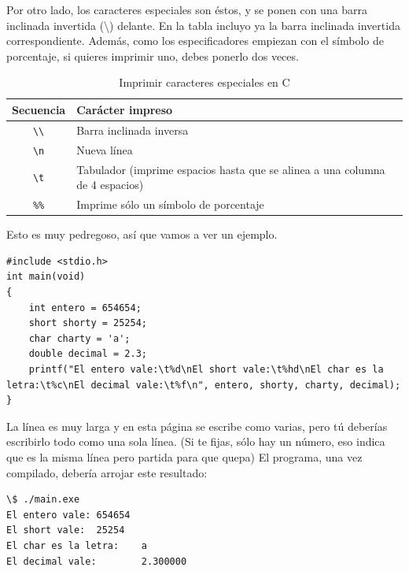 \documentclass[a4paper]{article}
\begin{document}
Por otro lado, los caracteres especiales son éstos, y se ponen con una barra
inclinada invertida (\textbackslash{}) delante. En la tabla incluyo ya la barra
inclinada invertida correspondiente. Además, como los especificadores empiezan
con el símbolo de porcentaje, si quieres imprimir uno, debes ponerlo dos veces.

\begin{table}[H]
\centering
\begin{tabularx}{\linewidth}{|c|Y|}
\hline
\textbf{Secuencia} & \textbf{Carácter impreso} \\\hline
\texttt{\textbackslash{}\textbackslash{}} & Barra inclinada inversa            \\\hline
\texttt{\textbackslash{}n}& Nueva línea                         \\\hline
\texttt{\textbackslash{}t}& Tabulador (imprime espacios hasta que se alinea a una columna de 4 espacios)   \\\hline
\texttt{\%\%}& Imprime sólo un símbolo de porcentaje   \\\hline
\end{tabularx}
\caption{Imprimir caracteres especiales en C}
\label{tab:specialCharsC}
\end{table}

Esto es muy pedregoso, así que vamos a ver un ejemplo.



\noindent
\begin{minipage}[H]{\linewidth}
\mbox{}
\begin{lstlisting}[style=C, caption={Ejemplo de impresión.},
label={lst:decimalvsintergerDivision}]
#include <stdio.h>
int main(void)
{
    int entero = 654654;
    short shorty = 25254;
    char charty = 'a';
    double decimal = 2.3;
    printf("El entero vale:\t%d\nEl short vale:\t%hd\nEl char es la letra:\t%c\nEl decimal vale:\t%f\n", entero, shorty, charty, decimal);
}
\end{lstlisting}
\end{minipage}


La línea es muy larga y en esta página se escribe como varias, pero tú deberías
escribirlo todo como una sola línea. (Si te fijas, sólo hay un número, eso
indica que es la misma línea pero partida para que quepa) El programa, una vez
compilado, debería arrojar este resultado:



\noindent
\begin{minipage}[H]{\linewidth}
\mbox{}
\begin{lstlisting}[style=terminalStyle]
\$ ./main.exe
El entero vale: 654654
El short vale:  25254
El char es la letra:    a
El decimal vale:        2.300000
\end{lstlisting}
\end{minipage}
\end{document}
